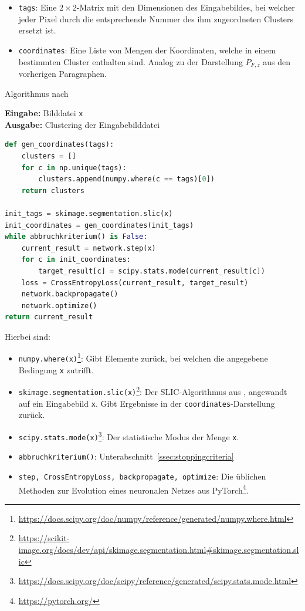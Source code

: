 \begin{itemize}
	\item{\lstinline[columns=fixed]{tags}:} Eine $2\times2$-Matrix mit den Dimensionen des Eingabebildes, bei welcher jeder Pixel durch die entsprechende Nummer des ihm zugeordneten Clusters ersetzt ist.
	\item{\lstinline[columns=fixed]{coordinates}:} Eine Liste von Mengen der Koordinaten, welche in einem bestimmten Cluster enthalten sind. Analog zu der Darstellung $P_{F,z}$ aus den vorherigen Paragraphen.
\end{itemize}

\begin{algorithm}[H]
\caption{Algorithmus nach \cite{kanezaki_18}}
\textbf{Eingabe:} Bilddatei \lstinline[columns=fixed]{x}\\
\textbf{Ausgabe:} Clustering der Eingabebilddatei 
\begin{lstlisting}[language=Python]
def gen_coordinates(tags):
	clusters = []
	for c in np.unique(tags):
		clusters.append(numpy.where(c == tags)[0])
	return clusters

init_tags = skimage.segmentation.slic(x)
init_coordinates = gen_coordinates(init_tags)
while abbruchkriterium() is False:
	current_result = network.step(x)
	for c in init_coordinates:
		target_result[c] = scipy.stats.mode(current_result[c])
	loss = CrossEntropyLoss(current_result, target_result)
	network.backpropagate()
	network.optimize()
return current_result
\end{lstlisting}
\end{algorithm}

Hierbei sind:

\begin{itemize}
	\item{\lstinline[columns=fixed]{numpy.where(x)}\footnote{\url{https://docs.scipy.org/doc/numpy/reference/generated/numpy.where.html}}:} Gibt Elemente zurück, bei welchen die angegebene Bedingung \lstinline[columns=fixed]{x} zutrifft.
	\item{\lstinline[columns=fixed]{skimage.segmentation.slic(x)}\footnote{\url{https://scikit-image.org/docs/dev/api/skimage.segmentation.html\#skimage.segmentation.slic}}:} Der SLIC-Algorithmus aus \cite{achanta_10}, angewandt auf ein Eingabebild \lstinline[columns=fixed]{x}. Gibt Ergebnisse in der \lstinline[columns=fixed]{coordinates}-Darstellung zurück.
	\item{\lstinline[columns=fixed]{scipy.stats.mode(x)}\footnote{\url{https://docs.scipy.org/doc/scipy/reference/generated/scipy.stats.mode.html}}:} Der statistische Modus der Menge \lstinline[columns=fixed]{x}.
	\item{\lstinline[columns=fixed]{abbruchkriterium()}:} \Vgl Unterabschnitt~\ref{ssec:stoppingcriteria}
	\item{\lstinline[columns=fixed]{step, CrossEntropyLoss, backpropagate, optimize}:} Die üblichen Methoden zur Evolution eines neuronalen Netzes aus PyTorch\footnote{\url{https://pytorch.org/}}.
\end{itemize}

